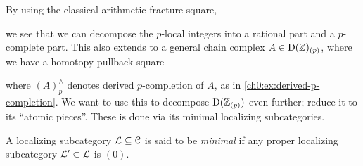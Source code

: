

By using the classical arithmetic fracture square, 
\begin{center}
\end{center}



we see that we can decompose the $p$-local integers into a rational part and a $p$-complete part. This also extends to a general chain complex $A\in \mathrm{D}(\mathbb{Z})_{(p)}$, where we have a homotopy pullback square 
\begin{center}
\end{center}
where $(A)_p^\wedge$ denotes derived $p$-completion of $A$, as in \cref{ch0:ex:derived-p-completion}. We want to use this to decompose $\mathrm{D}(\mathbb{Z}_{(p)})$ even further; reduce it to its ``atomic pieces''. These is done via its minimal localizing subcategories. 

\begin{definition}
    \label{ch0:def:minimal-localizing-subcategory}
    A localizing subcategory $\mathcal{L}\subseteq \EuScript{C}$ is said to be \emph{minimal} if any proper localizing subcategory $\mathcal{L}'\subset \mathcal{L}$ is $(0)$.  
\end{definition}

